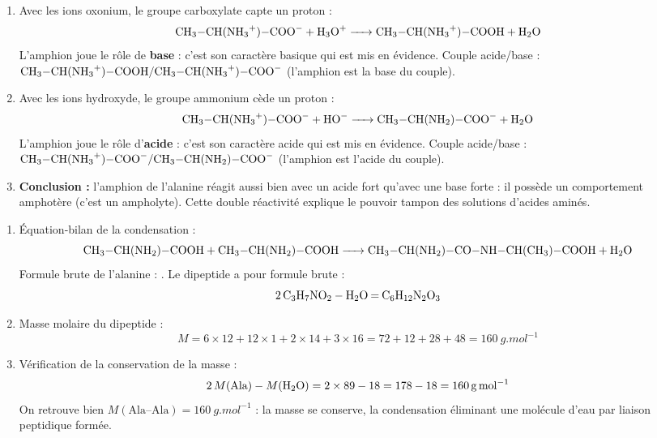 \documentclass[11pt]{article}
\newcommand{\cle}[1]{{\popxbold\color{popdark}#1}}
\begin{document}
\begin{corrige}
\begin{enumerate}
\item Avec les ions oxonium, le groupe carboxylate  capte un proton :
\[ \ce{CH3-CH(NH3+)-COO- + H3O+ -> CH3-CH(NH3+)-COOH + H2O} \]
L'amphion joue le rôle de \textbf{base} : c'est son \cle{caractère basique} qui est mis en évidence. Couple acide/base : $\ce{CH3-CH(NH3+)-COOH}/\ce{CH3-CH(NH3+)-COO-}$ (l'amphion est la base du couple).
\item Avec les ions hydroxyde, le groupe ammonium  cède un proton :
\[ \ce{CH3-CH(NH3+)-COO- + HO- -> CH3-CH(NH2)-COO- + H2O} \]
L'amphion joue le rôle d'\textbf{acide} : c'est son \cle{caractère acide} qui est mis en évidence. Couple acide/base : $\ce{CH3-CH(NH3+)-COO-}/\ce{CH3-CH(NH2)-COO-}$ (l'amphion est l'acide du couple).
\item \textbf{Conclusion :} l'amphion de l'alanine réagit aussi bien avec un acide fort qu'avec une base forte : il possède un comportement \cle{amphotère} (c'est un ampholyte). Cette double réactivité explique le pouvoir tampon des solutions d'acides aminés.
\end{enumerate}
\end{corrige}

\begin{corrige}
\begin{enumerate}
\item Équation-bilan de la condensation :
\[ \ce{CH3-CH(NH2)-COOH + CH3-CH(NH2)-COOH -> CH3-CH(NH2)-CO-NH-CH(CH3)-COOH + H2O} \]
Formule brute de l'alanine : . Le dipeptide a pour formule brute :
\[ \ce{2 C3H7NO2 - H2O = C6H12N2O3} \]
\item Masse molaire du dipeptide  :
\[ M = 6\times 12 + 12\times 1 + 2\times 14 + 3\times 16 = 72 + 12 + 28 + 48 = \SI{160}{g.mol^{-1}} \]
\item Vérification de la conservation de la masse :
\[ 2\,M(\text{Ala}) - M(\ce{H2O}) = 2\times 89 - 18 = 178 - 18 = \SI{160}{g.mol^{-1}} \]
On retrouve bien $M(\text{Ala--Ala}) = \SI{160}{g.mol^{-1}}$ : la masse se conserve, la condensation éliminant une molécule d'eau par liaison peptidique formée.
\end{enumerate}
\end{corrige}
\end{document}
